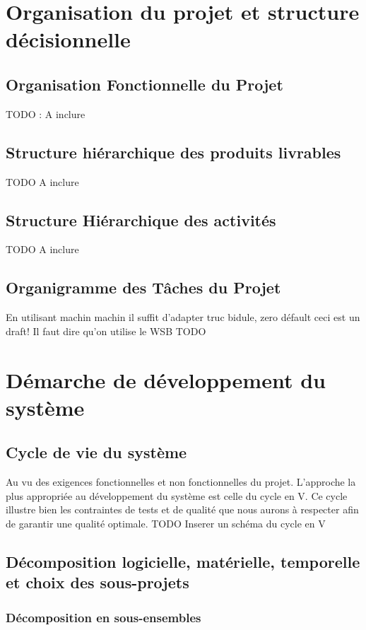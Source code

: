 \section{Organisation du projet et structure décisionnelle}
\subsection{Organisation Fonctionnelle du Projet}
TODO : 
A inclure

\subsection{Structure hiérarchique des produits livrables}
TODO
A inclure

\subsection{Structure Hiérarchique des activités}
TODO
A inclure

\subsection{Organigramme des Tâches du Projet} 
En utilisant machin machin il suffit d'adapter truc bidule, zero défault ceci est un draft!
Il faut dire qu'on utilise le WSB
TODO
\section{Démarche de développement du système}
\subsection{Cycle de vie du système}


Au vu des exigences fonctionnelles et non fonctionnelles du projet. L'approche la plus appropriée au développement du système est celle du
cycle en V. Ce cycle illustre bien les contraintes de tests et de qualité que nous aurons à respecter afin de garantir une qualité optimale.
TODO Inserer un schéma du cycle en V


\subsection{Décomposition logicielle, matérielle, temporelle et choix des sous-projets}
\subsubsection{Décomposition en sous-ensembles}

